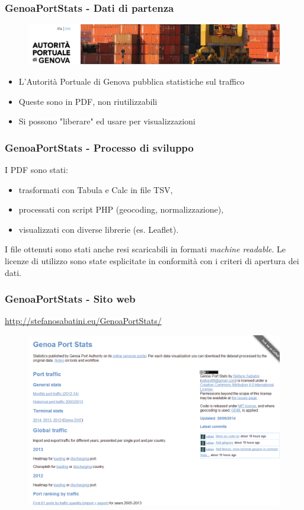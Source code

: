 \documentclass{beamer}
\begin{document}
\begin{frame}
\frametitle{GenoaPortStats - Dati di partenza} 
\begin{figure}
\includegraphics[width=\textwidth]{../img/autorita.png} 
\end{figure}
\begin{itemize}
\item L'Autorità Portuale di Genova pubblica statistiche sul traffico
\item Queste sono in PDF, non riutilizzabili
\item Si possono "liberare" ed usare per visualizzazioni
\end{itemize}
\end{frame}

\begin{frame}
\frametitle{GenoaPortStats - Processo di sviluppo} 
I PDF sono stati:
\begin{itemize}
\item trasformati con Tabula e Calc in file TSV,
\item processati con script PHP (geocoding, normalizzazione),
\item visualizzati con diverse librerie (es. Leaflet).
\end{itemize}
I file ottenuti sono stati anche resi scaricabili in formati \emph{machine readable}.
Le licenze di utilizzo sono state esplicitate in conformità con i criteri di apertura dei dati.
\end{frame}

\begin{frame}
\frametitle{GenoaPortStats - Sito web}
\href{http://stefanosabatini.eu/GenoaPortStats/}{http://stefanosabatini.eu/GenoaPortStats/}
\begin{figure}
\includegraphics[width=\textwidth]{../img/portstats_home.png} 
\end{figure}
\end{frame}
\end{document}
